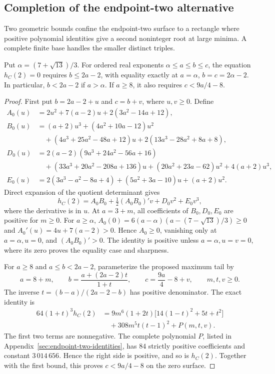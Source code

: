 \subsection{Completion of the endpoint-two alternative}

Two geometric bounds confine the endpoint-two surface to a rectangle
where positive polynomial identities give a second noninteger root at
large minima. A complete finite base handles the smaller distinct triples.

\begin{lemma}
\label{lem:endpoint-two-rectangle}
Put $\alpha=(7+\sqrt{13})/3$.
For ordered real exponents $\alpha\leq a\leq b\leq c$, the equation
$h_C(2)=0$ requires $b\leq2a-2$, with equality exactly at
$a=\alpha$, $b=c=2\alpha-2$. In particular, $b<2a-2$ if $a>\alpha$.
If $a\geq8$, it also requires
$c<9a/4-8$.
\end{lemma}

\begin{proof}
First put $b=2a-2+u$ and $c=b+v$, where $u,v\geq0$. Define
\begin{align*}
 A_0(u)&=2u^2+7(a-2)u+2(3a^2-14a+12),\\
 B_0(u)&=(a+2)u^3+(4a^2+10a-12)u^2\\
 &\quad +(4a^3+25a^2-48a+12)u+2(13a^3-28a^2+8a+8),\\
 D_0(u)&=2(a-2)(9a^3+24a^2-56a+16)\\
 &\quad +(33a^3+20a^2-208a+136)u
 +(20a^2+23a-62)u^2+4(a+2)u^3,\\
 E_0(u)&=2(3a^3-a^2-8a+4)+(5a^2+3a-10)u+(a+2)u^2.
\end{align*}
Direct expansion of the quotient determinant gives
\[
 h_C(2)=A_0B_0+\tfrac12(A_0B_0)'v+D_0v^2+E_0v^3,
\]
where the derivative is in $u$. At $a=3+m$, all coefficients of
$B_0,D_0,E_0$ are positive for $m\geq0$. For $a\geq\alpha$,
$A_0(0)=6(a-\alpha)(a-(7-\sqrt{13})/3)\geq0$ and
$A_0'(u)=4u+7(a-2)>0$. Hence $A_0\geq0$, vanishing only at
$a=\alpha,u=0$, and $(A_0B_0)'>0$. The identity is positive
unless $a=\alpha,u=v=0$, where its zero proves the equality case
and sharpness.

For $a\geq8$ and $a\leq b<2a-2$, parameterize the proposed maximum
tail by
\[
 a=8+m,\qquad b=\frac{a+(2a-2)t}{1+t},\qquad
 c=\frac{9a}{4}-8+v,\qquad m,t,v\geq0.
\]
The inverse $t=(b-a)/(2a-2-b)$ has positive denominator. The exact
identity is
\begin{align*}
 64(1+t)^3h_C(2)
 &=9m^6(1+2t)\bigl[14(1-t)^2+5t+t^2\bigr]\\
 &\quad+308m^5t(t-1)^2+P(m,t,v).
\end{align*}
The first two terms are nonnegative. The complete polynomial $P$,
listed in Appendix~\ref{sec:endpoint-two-identities}, has $84$ strictly
positive coefficients and constant $3\,014\,656$. Hence the right side
is positive, and so is $h_C(2)$. Together with the first bound, this
proves $c<9a/4-8$ on the zero surface.
\end{proof}

